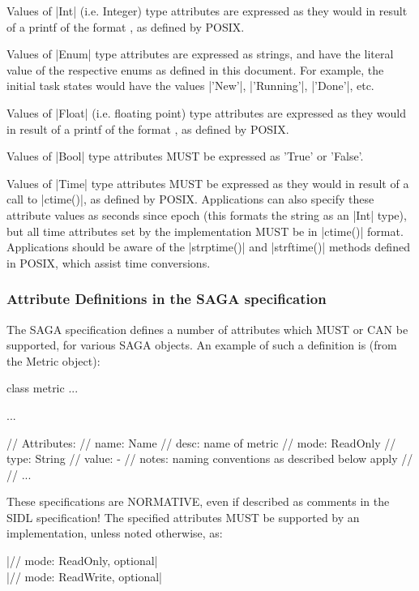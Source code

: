   Values of |Int| (i.e. Integer) type attributes are expressed
  as they would in result of a printf of the format
  , as defined by POSIX.
 
  Values of |Enum| type attributes are expressed as strings, and
  have the literal value of the respective enums as defined in
  this document.  For example, the initial task states would
  have the values |'New'|, |'Running'|, |'Done'|, etc.
 
  Values of |Float| (i.e. floating point) type attributes
  are expressed as they would in result of a printf of the
  format , as defined by POSIX.
 
  Values of |Bool| type attributes MUST be expressed as
  'True' or 'False'.
 
  Values of |Time| type attributes MUST be expressed as they
  would in result of a call to |ctime()|, as defined by POSIX.
  Applications can also specify these attribute values as
  seconds since epoch (this formats the string as
  an |Int| type), but all time attributes set by the
  implementation MUST be in |ctime()| format.  Applications
  should be aware of the |strptime()| and |strftime()| methods
  defined in POSIX, which assist time conversions.
 
 
 \subsubsection{Attribute Definitions in the SAGA specification}
 
  The SAGA specification defines a number of attributes which
  MUST or CAN be supported, for various SAGA objects.  An
  example of such a definition is (from the Metric
  object):
 
  \begin{myspectxt}
        class metric ...
        {
          ...
 
          // Attributes:
          //   name:  Name
          //   desc:  name of metric
          //   mode:  ReadOnly
          //   type:  String
          //   value: -
          //   notes: naming conventions as described below apply
          //
          //   ...
        }
  \end{myspectxt}
 
    These specifications are NORMATIVE, even if described as
    comments in the SIDL specification!  The specified
    attributes MUST be supported by an implementation, unless
    noted otherwise, as:
 
    \shift |//  mode:  ReadOnly, optional|\\
    \shift |//  mode:  ReadWrite, optional|
 
